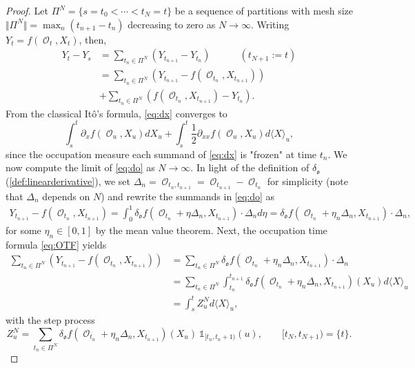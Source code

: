 \documentclass[11pt]{article}
\def\mo{\mathfrak{o}}
\theoremstyle{plain}
\theoremstyle{definition}
\DeclareMathOperator{\Q}{\mathbb{Q}}
\DeclareMathOperator{\calO}{\mathcal{O}}
\begin{document}
\begin{proof} 
  Let  $\Pi^N = \{s=t_0 < \cdots < t_N = t\}$ be a sequence of partitions with mesh size   $\Vert \Pi^N\Vert = \max_{n}(t_{n+1} - t_n)$ decreasing to zero as $N\to \infty$.  Writing  $Y_t = f(\calO_{t},X_{t})$, then, 
   \begin{align}
       Y_t - Y_s &= \sum_{t_n\in\Pi^N} (Y_{t_{n+1}} - Y_{t_{n}}) \quad \qquad (t_{N+1} := t)\nonumber \\
        &= \sum_{t_n\in\Pi^N} (Y_{t_{n+1}} - f(\calO_{t_{n}},X_{t_{n+1}}))\label{eq:do}\\
        &+ \sum_{t_n\in\Pi^N} (f(\calO_{t_{n}},X_{t_{n+1}}) - Y_{t_{n}}).\label{eq:dx}
   \end{align}
    From the classical Itô's formula, 
  \eqref{eq:dx}  converges to 
   $$\int_s^t \partial_x f(\calO_u,X_u) dX_u + \int_s^t \frac{1}{2}\partial_{xx} f(\calO_u,X_u) d\langle X \rangle_u, $$ 
   since the occupation measure each  summand of \eqref{eq:dx} is "frozen" at time $t_n$. 
   We now compute the limit of \eqref{eq:do} as $N\to \infty$. In light of the definition of $\delta_\mo$ (\cref{def:linearderivative}), we set $\Delta_n = \calO_{t_n,t_{n+1}} = \calO_{t_{n+1}} - \calO_{t_{n}}$ for simplicity (note that $\Delta_n$ depends on $N$) 
   and rewrite  the summands in \eqref{eq:do} as 
   \begin{align*}
       Y_{t_{n+1}} - f(\calO_{t_{n}},X_{t_{n+1}}) = \int_0^1  \delta_\mo f(\calO_{t_{n}}+ \eta \Delta_n,X_{t_{n+1}}) \cdot \Delta_n d\eta  
      =  \delta_\mo f(\calO_{t_{n}}+ \eta_n \Delta_n,X_{t_{n+1}}) \cdot \Delta_n,
   \end{align*}
  for some $\eta_n \in [0,1]$ by the mean value theorem. Next,  the occupation time formula \eqref{eq:OTF} yields 
    \begin{align*}
      \sum_{t_n\in\Pi^N} ( Y_{t_{n+1}} - f(\calO_{t_{n}},X_{t_{n+1}})) &=   \sum_{t_n\in\Pi^N} 
      \delta_\mo f(\calO_{t_{n}}+ \eta_n \Delta_n,X_{t_{n+1}}) \cdot \Delta_n \\
      &= \sum_{t_n\in\Pi^N} 
      \int_{t_n}^{t_{n+1}} 
    \delta_\mo f(\calO_{t_{n}}+ \eta_n \Delta_n,X_{t_{n+1}})(X_u) d\langle X \rangle_u \\
       &= \int_s^t Z^N_u d\langle X \rangle_u, 
   \end{align*}
   with the step process
   $$    
     Z^N_u =   \sum_{t_n\in\Pi^N} \delta_\mo f(\calO_{t_{n}}+ \eta_n  \Delta_n,X_{t_{n+1}})(X_u) \ \mathds{1}_{[t_n,t_n+1)}(u),  \qquad [t_N,t_{N+1}) = \{t\}.$$

\end{proof}
\end{document}
